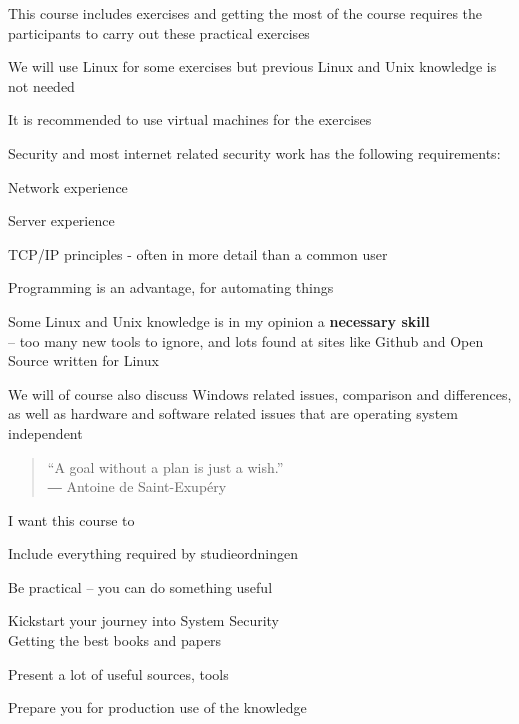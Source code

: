\documentclass[Screen16to9,17pt]{foils}
\begin{document}
\begin{list1}
\item This course includes exercises and getting the most of the course requires the participants to carry out these practical exercises
\item We will use Linux for some exercises but previous Linux and Unix knowledge is not needed
\item It is recommended to use virtual machines for the exercises
\item Security and most internet related security work has the following requirements:
\begin{list2}
\item Network experience
\item Server experience
\item TCP/IP principles - often in more detail than a common user
\item Programming is an advantage, for automating things
\item Some Linux and Unix knowledge is in my opinion a {\bf necessary skill}\\
-- too many new tools to ignore, and lots found at sites like Github and Open Source written for Linux
\end{list2}
\item We will of course also discuss Windows related issues, comparison and differences, as well as hardware and software related issues that are operating system independent
\end{list1}





\begin{quote}
  “A goal without a plan is just a wish.”\\
  ― Antoine de Saint-Exupéry
\end{quote}

I want this course to
\begin{list2}
\item Include everything required by studieordningen
\item Be practical -- you can do something useful
\item Kickstart your journey into System Security\\
Getting the best books and papers
\item Present a lot of useful sources, tools
\item Prepare you for production use of the knowledge
\end{list2}
\end{document}
